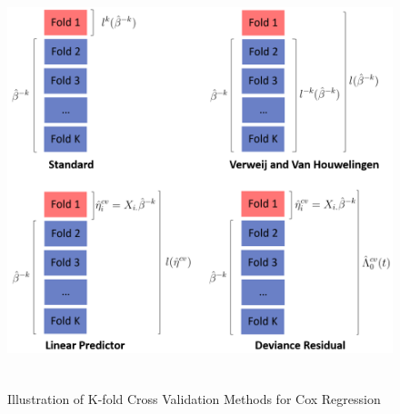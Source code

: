
\begin{figure}
  \centering
  \includegraphics[height= 12cm ]{./figures/figure_1_new.png}
  \caption{Illustration of K-fold Cross Validation Methods for Cox Regression}
\end{figure}	

